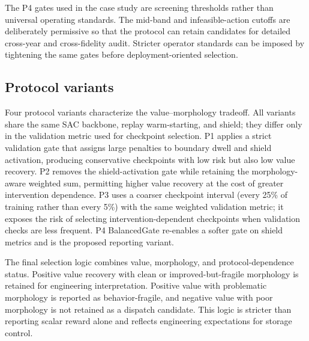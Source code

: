 The P4 gates used in the case study are screening thresholds rather than universal operating standards. The mid-band and infeasible-action cutoffs are deliberately permissive so that the protocol can retain candidates for detailed cross-year and cross-fidelity audit. Stricter operator standards can be imposed by tightening the same gates before deployment-oriented selection.

\subsection{Protocol variants}

Four protocol variants characterize the value--morphology tradeoff. All variants share the same SAC backbone, replay warm-starting, and shield; they differ only in the validation metric used for checkpoint selection. P1 applies a strict validation gate that assigns large penalties to boundary dwell and shield activation, producing conservative checkpoints with low risk but also low value recovery. P2 removes the shield-activation gate while retaining the morphology-aware weighted sum, permitting higher value recovery at the cost of greater intervention dependence. P3 uses a coarser checkpoint interval (every 25\% of training rather than every 5\%) with the same weighted validation metric; it exposes the risk of selecting intervention-dependent checkpoints when validation checks are less frequent. P4 BalancedGate re-enables a softer gate on shield metrics and is the proposed reporting variant.

The final selection logic combines value, morphology, and protocol-dependence status. Positive value recovery with clean or improved-but-fragile morphology is retained for engineering interpretation. Positive value with problematic morphology is reported as behavior-fragile, and negative value with poor morphology is not retained as a dispatch candidate. This logic is stricter than reporting scalar reward alone and reflects engineering expectations for storage control.
